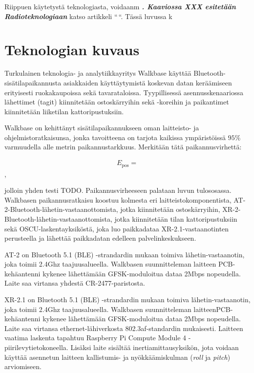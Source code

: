 \documentclass[
  12pt,
  a4paper, twoside]{book}
\begin{document}
Riippuen käytetystä teknologiasta, voidaanm \textbf{\emph{. Kaaviossa XXX esitetään
Radioteknologiaan }} katso artikkeli ``\,``. Tässä luvussa k

\section{Teknologian kuvaus}

Turkulainen teknologia- ja analytiikkayritys Walkbase käyttää Bluetooth-sisätilapaikannusta asiakkaiden käyttäytymistä koskevan datan keräämiseen erityisesti ruokakaupoissa sekä tavarataloissa. Tyypillisessä asennusskenaariossa lähettimet (tagit) kiinnitetään ostoskärryihin sekä -koreihin ja paikantimet kiinnitetään liiketilan kattoripustuksiin.

Walkbase on kehittänyt sisätilapaikannukseen oman laitteisto- ja ohjelmistoratkaisunsa, jonka tavoitteena on tarjota kaikissa ympäristöissä \(95\%\) varmuudella alle metrin paikannustarkkuus. Merkitään tätä paikannusvirhettä:

\begin{align}\label{paikannusvirhe}
E_{\text{pos}} = 
\end{align},

jolloin yhden testi TODO. Paikannusvirheeseen palataan luvun tulososassa. Walkbasen paikannusratkaisu koostuu kolmesta eri laitteistokomponentista, AT-2-Bluetooth-lähetin-vastaanottomista, jotka kiinnitetään ostoskärryihin, XR-2-Bluetooth-lähetin-vastaanottomista, jotka kiinnitetään tilan kattoripustuksiin sekä OSCU-laskentayksiköstä, joka luo paikkadataa XR-2.1-vastaanotinten perusteella ja lähettää paikkadatan edelleen palvelinkeskukseen.

AT-2 on Bluetooth 5.1 (BLE) -strandardin mukaan toimiva lähetin-vastaanotin, joka toimii 2.4Ghz taajuusalueella. Walkbasen suunnitteleman laitteen PCB-kehäantenni kykenee lähettämään GFSK-moduloitua dataa 2Mbps nopeudella. Laite saa virtansa yhdestä CR-2477-paristosta.

XR-2.1 on Bluetooth 5.1 (BLE) -strandardin mukaan toimiva lähetin-vastaanotin, joka toimii 2.4Ghz taajuusalueella. Walkbasen suunnitteleman laitteenPCB-kehäantenni kykenee lähettämään GFSK-moduloitua dataa 2Mbps nopeudella. Laite saa virtansa ethernet-lähiverkosta 802.3af-standardin mukaisesti. Laitteen vaatima laskenta tapahtuu Raspberry Pi Compute Module 4 -piirilevytietokoneella. Lisäksi laite sisältää inertiamittausyksikön, jota voidaan käyttää asennetun laitteen kallistumis- ja nyökkäämiskulman (\emph{roll} ja \emph{pitch}) arviomiseen.
\end{document}
